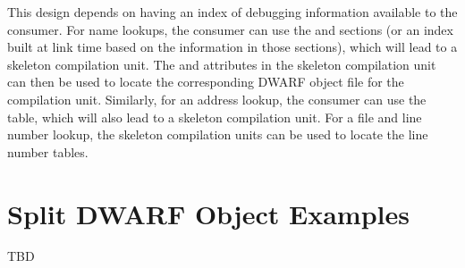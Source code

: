 This design depends on having an index of debugging information
available to the consumer. For name lookups, the consumer can use
the \dotdebugpubnames{} and \dotdebugpubtypes{} sections (or an index
built at link time based on the information in those sections),
which will lead to a skeleton compilation unit. The
\DWATcompdir{} and \DWATdwoname{} attributes in the skeleton
compilation unit can then be used to locate the corresponding
DWARF object file for the compilation unit. Similarly, for an
address lookup, the consumer can use the \dotdebugaranges{} table,
which will also lead to a skeleton compilation unit. For a file
and line number lookup, the skeleton compilation units can be
used to locate the line number tables.

\section{Split DWARF Object Examples}
\label{app:splitdwarfobjectexamples}

TBD